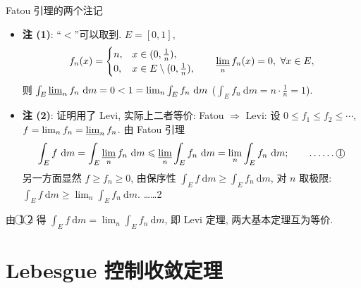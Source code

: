 \begin{frame}{Fatou 引理的两个注记}

\begin{itemize}
\item \textbf{注 (1)}: ``$<$''可以取到. $E = [0,1]$,
\[
f_n(x) =
\begin{cases}
n, & x \in (0, \tfrac{1}{n}), \\
0, & x \in E \setminus (0, \tfrac{1}{n}) ,
\end{cases}
\qquad
\varliminf_n f_n(x) = 0 ,\ \forall x \in E,
\]
则 $\int_E \varliminf_n f_n ~ \mathrm{d} m = 0 < 1 = \lim_n \int_E f_n ~ \mathrm{d} m$
($\int_E f_n ~ \mathrm{d} m = n \cdot \tfrac1n = 1$).

\pause

\item \textbf{注 (2)}: 证明用了 Levi, 实际上二者\alert{等价}:
Fatou $\Rightarrow$ Levi: 设 $0 \leqslant f_1 \leqslant f_2 \leqslant \cdots$,
$f = \lim_n f_n = \varliminf_n f_n$. 由 Fatou 引理
\[
\int_E f ~ \mathrm{d} m
= \int_E \varliminf_n f_n ~ \mathrm{d} m
\leqslant \varliminf_n \int_E f_n ~ \mathrm{d} m
= \lim_n \int_E f_n ~ \mathrm{d} m ;
\qquad \text{……\textcircled{1}}
\]
另一方面显然 $f \geqslant f_n \geqslant 0$, 由保序性 $\int_E f ~ \mathrm{d} m \geqslant \int_E f_n ~ \mathrm{d} m$,
对 $n$ 取极限: $\int_E f ~ \mathrm{d} m \geqslant \lim_n \int_E f_n ~ \mathrm{d} m$. ……\textcircled{2}
\end{itemize}

\pause

\begin{attnblock}
由 \textcircled{1} \textcircled{2} 得 $\int_E f ~ \mathrm{d} m = \lim_n \int_E f_n ~ \mathrm{d} m$,
即 Levi 定理, 两大基本定理互为等价.
\end{attnblock}

\end{frame}


\section[控制收敛]{Lebesgue 控制收敛定理}


